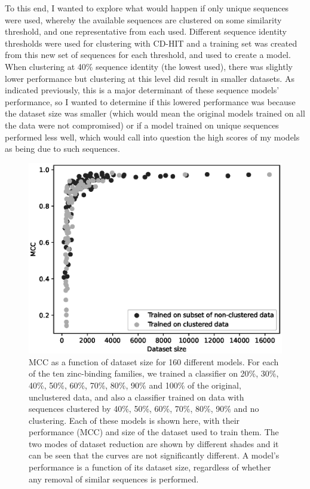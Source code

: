 To this end, I wanted to explore what would happen if only unique sequences were used, whereby the available sequences are clustered on some similarity threshold, and one representative from each used. Different sequence identity thresholds were used for clustering with CD-HIT and a training set was created from this new set of sequences for each threshold, and used to create a model. When clustering at 40\% sequence identity (the lowest used), there was slightly lower performance but clustering at this level did result in smaller datasets. As indicated previously, this is a major determinant of these sequence models' performance, so I wanted to determine if this lowered performance was because the dataset size was smaller (which would mean the original models trained on all the data were not compromised) or if a model trained on unique sequences performed less well, which would call into question the high scores of my models as being due to such sequences.

\begin{figure}
\centering
\includegraphics[width=1.0\textwidth]{Figures/clustering.eps}
\caption[MCC as a function of dataset size for 160 different models.]{\label{fig:clustering} MCC as a function of dataset size for
  160 different models.
  For each of the ten zinc-binding families, we trained a
  classifier on 20\%, 30\%, 40\%, 50\%, 60\%, 70\%, 80\%, 90\% and
  100\% of the original, unclustered data, and also a classifier
  trained on data with sequences clustered by 40\%, 50\%, 60\%, 70\%,
  80\%, 90\% and no clustering. Each of these models is shown here,
  with their performance (MCC) and size of the dataset used to train
  them. The two modes of dataset reduction are shown by different
  shades and it can be seen that the curves are not significantly
  different. A
  model's performance is a function of its dataset size, regardless of
  whether any removal of similar sequences is performed.}
\end{figure}

